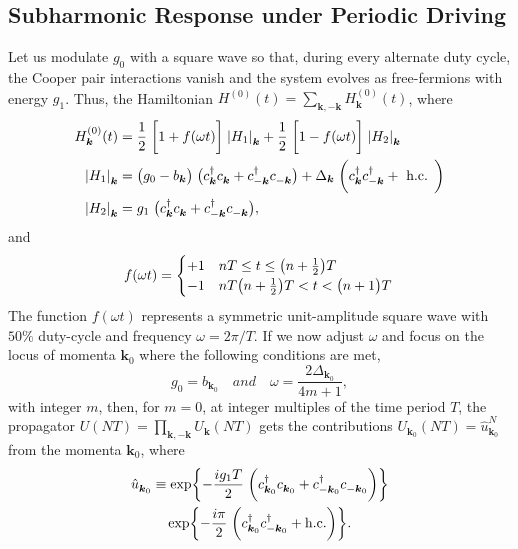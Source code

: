 \documentclass[preprint,5p,times,twocolumn]{elsarticle}
\newcommand{\bmk}{\bm{k}}
\begin{document}
\subsection{Subharmonic Response under Periodic Driving}
\label{subsec:subharmonics}
Let us modulate $g_0$ with a square wave so that, during every alternate duty cycle, the Cooper pair interactions vanish and the system evolves as free-fermions with energy $g_1$. Thus, the Hamiltonian $H^{(0)}(t) = \sum_{\bmk, -\bmk} H^{(0)}_{\bmk}(t)$, where
\begin{align}
    H^{(0)}_{\bmk}(t) &= \frac12\;\bigg[1+f(\omega t)\bigg]\;\vqty{H_1}_{\bmk} + \frac12\;\bigg[1-f(\omega t)\bigg]\;\vqty{H_2}_{\bmk} \label{eq:full:hamilt:sc}\\
    \vqty{H_1}_{\bmk} &= \big(g_0-b_{\bmk}\big)\;\big(c^{\dagger}_{\bmk} c^{\;}_{\bmk}+c^{\dagger}_{-\bmk} c^{\;}_{-\bmk}\big)+\Delta_{\bmk}\;\bigg(c^{\dagger}_{\bmk} c^{\dagger}_{-\bmk}+\text { h.c. }\bigg)\nonumber\\
    \vqty{H_2}_{\bmk} &={g_1}\;\big(c^{\dagger}_{\bmk} c^{\;}_{\bmk}+c^{\dagger}_{-\bmk} c^{\;}_{-\bmk}\big),\label{eq:full:hamilt}
\end{align}
and
\begin{equation}
    f(\omega t)=
    \begin{cases}
        +1 & nT \leq t \leq \big(n+\frac12 \big) T \\
        -1 & nT \big(n+\frac12 \big) T < t < \big(n+1\big)T 
    \end{cases}\\
\end{equation}
The function $f(\omega t)$ represents a symmetric unit-amplitude square wave with $50\%$ duty-cycle and frequency $\omega=2\pi/T$.
If we now adjust $\omega$ and focus on the locus of momenta $\bmk_0$ where the following conditions are met,
\begin{equation}
    \label{eq:tc:ks}
    g_0 = b_{\bmk_0}\quad and \quad \omega = \frac{2\Delta_{\bmk_0}}{4m+1},
\end{equation}
with integer $m$, then, for $m=0$, at integer multiples of the time period $T$, the propagator $U(NT) = \displaystyle\prod_{\bmk, -\bmk}U_{\bmk}(NT)$ gets the contributions $U_{\bmk_0}(NT) =  \hat{u}^N_{\bmk_0}$ from the momenta $\bmk_0$, where
\begin{multline}
    \hat{u}^{\;}_{\bmk_0} \equiv \exp{-\frac{ig_1T}{2}\;\bigg(c^{\dagger} _{\bmk_0} c^{\;}_{\bmk_0} + c^{\dagger} _{-\bmk_0} c^{\;}_{-\bmk_0}\bigg)}\\
    \exp{-\frac{i\pi}{2}\;\bigg(c^{\dagger} _{\bmk_0} c^\dagger_{-\bmk_0}+ \rm{h.c.}\bigg)}.
\end{multline}
\end{document}
